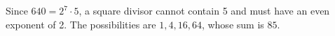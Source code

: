 Since $640=2^7\cdot 5$, a square divisor cannot contain 5 and must have an even exponent of 2. The possibilities are $1,4,16,64$, whose sum is $\boxed{85}$.
